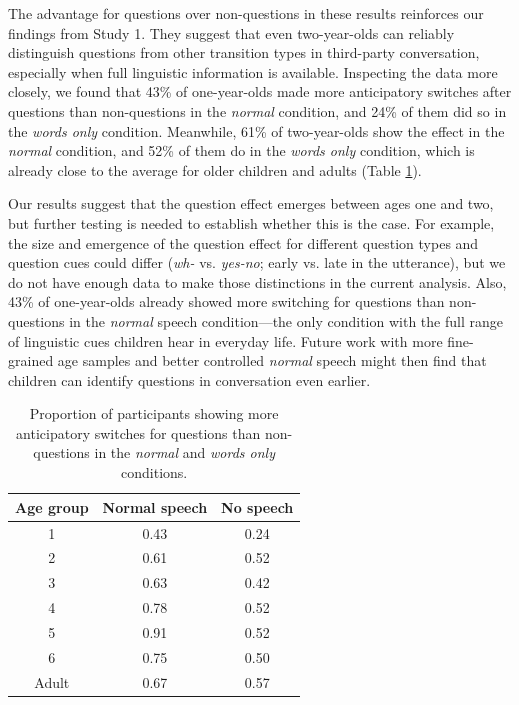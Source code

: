 \documentclass[authoryear, 12pt]{elsarticle}
\begin{document}
The advantage for questions over non-questions in these results reinforces our findings from Study 1. They suggest that even two-year-olds can reliably distinguish questions from other transition types in third-party conversation, especially when full linguistic information is available. Inspecting the data more closely, we found that 43\% of one-year-olds made more anticipatory switches after questions than non-questions in the \textit{normal} condition, and 24\% of them did so in the \textit{words only} condition. Meanwhile, 61\% of two-year-olds show the effect in the \textit{normal} condition, and 52\% of them do in the \textit{words only} condition, which is already close to the average for older children and adults (Table \ref{tab:questioneffectexp2}).

Our results suggest that the question effect emerges between ages one and two, but further testing is needed to establish whether this is the case. For example, the size and emergence of the question effect for different question types and question cues could differ (\textit{wh-} vs. \textit{yes-no}; early vs. late in the utterance), but we do not have enough data to make those distinctions in the current analysis. Also, 43\% of one-year-olds already showed more switching for questions than non-questions in the \textit{normal} speech condition---the only condition with the full range of linguistic cues children hear in everyday life. Future work with more fine-grained age samples and better controlled \textit{normal} speech might then find that children can identify questions in conversation even earlier.

\begin{table}[t]
\begin{center}
  \begin{tabular}{ccc}
    \hline
    Age group & Normal speech & No speech \\ 
    \hline
    1 & 0.43 & 0.24 \\
    2 & 0.61 & 0.52 \\
    3 & 0.63 & 0.42 \\
    4 & 0.78 & 0.52 \\
    5 & 0.91 & 0.52 \\
    6 & 0.75 & 0.50 \\
    Adult & 0.67 & 0.57 \\
    \hline
  \end{tabular}
\end{center}
  \caption{Proportion of participants showing more anticipatory switches for questions than non-questions in the \textit{normal} and \textit{words only} conditions.}
\label{tab:questioneffectexp2}
\end{table}
\end{document}
